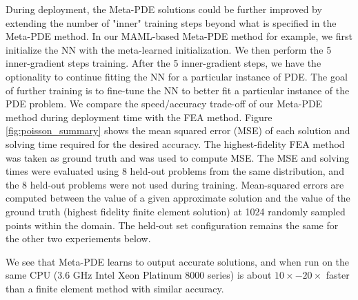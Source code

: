 During deployment, the Meta-PDE solutions could be further improved by extending the number of "inner" training steps beyond what is specified in the Meta-PDE method. In our MAML-based Meta-PDE method for example, we first initialize the NN with the meta-learned initialization. We then perform the 5 inner-gradient steps training. After the 5 inner-gradient steps, we have the optionality to continue fitting the NN for a particular instance of PDE. The goal of further training is to fine-tune the NN to better fit a particular instance of the PDE problem. We compare the speed/accuracy trade-off of our Meta-PDE method during deployment time with the FEA method. Figure \ref{fig:poisson_summary} shows the mean squared error (MSE) of each solution and solving time required for the desired accuracy. The highest-fidelity FEA method was taken as ground truth and was used to compute MSE. The MSE and solving times were evaluated using 8 held-out problems from the same distribution, and the 8 held-out problems were not used during training. Mean-squared errors are computed between the value of a given approximate solution and the value of the ground truth (highest fidelity finite element solution) at 1024 randomly sampled points within the domain. The held-out set configuration remains the same for the other two experiements below. 


We see that Meta-PDE learns to output accurate solutions, and when run on the same CPU (3.6 GHz Intel Xeon Platinum 8000 series) is about $10\times - 20\times$ faster than a finite element method with similar accuracy.






